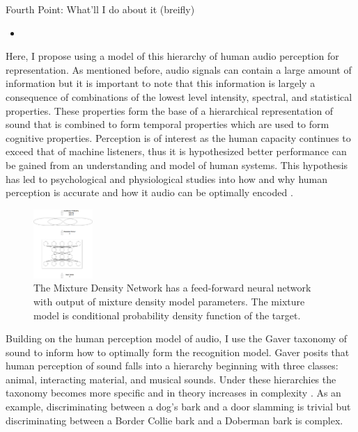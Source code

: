 Fourth Point: What'll I do about it (breifly)
\begin{itemize}
    \item 
\end{itemize}

Here, I propose using a model of this hierarchy of human audio perception for representation. As mentioned before, audio signals can contain a large amount of information but it is important to note that this information is largely a consequence of combinations of the lowest level intensity, spectral, and statistical properties. These properties form the base of a hierarchical representation of sound that is combined to form temporal properties which are used to form cognitive properties. Perception is of interest as the human capacity continues to exceed that of machine listeners, thus it is hypothesized better performance can be gained from an understanding and model of human systems. This hypothesis has led to psychological and physiological studies into how and why human perception is accurate and how it audio can be optimally encoded \cite{Gaver1993, Eggermont2001, slaney1993importance, Piazza2013}.

\begin{figure}
    \begin{center}
        \includegraphics[width=0.2\textwidth]{figures/MDN.png}
    \end{center}
    \caption{The Mixture Density Network has a feed-forward neural network with output of mixture density model parameters. The mixture model is conditional probability density function of the target.}
    \label{fig:MDN}
\end{figure}

Building on the human perception model of audio, I use the Gaver taxonomy of sound to inform how to optimally form the recognition model. Gaver posits that human perception of sound falls into a hierarchy beginning with three classes: animal, interacting material, and musical sounds. Under these hierarchies the taxonomy becomes more specific and in theory increases in complexity \cite{Gaver1993}. As an example, discriminating between a dog's bark and a door slamming is trivial but discriminating between a Border Collie bark and a Doberman bark is complex.


